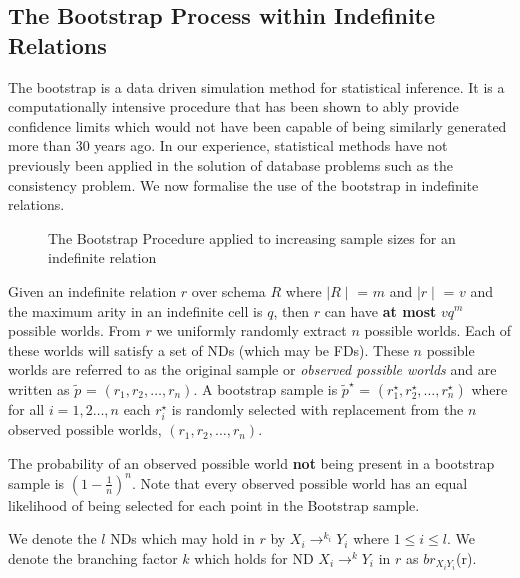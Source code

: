 \subsection{The Bootstrap Process within Indefinite Relations}


The bootstrap \cite{et93} is a data driven simulation method for
statistical inference. It is a computationally intensive procedure
that has been shown to ably provide confidence limits which would not have
been capable of being similarly generated more than 30 years ago.
In our experience, statistical methods have not previously been 
applied in the solution of database problems such as the consistency problem.
We now formalise the use of the bootstrap in indefinite relations.
\medskip

\begin{figure}[ht]
\centerline{}
\caption{\label{fig:inc_boot} The Bootstrap Procedure applied to
increasing sample sizes for an indefinite relation }
\end{figure}


\begin{definition}
\begin{rm}
Given an indefinite relation $r$ over schema $R$ where $\mid R \mid$ =
$m$ and $\mid r \mid$ = $v$ and the maximum arity in an
indefinite cell is $q$, then $r$ can have {\bf at most} $vq^{m}$ possible
worlds.  From $r$ we uniformly randomly extract $n$ possible worlds.
Each of these worlds will satisfy a set of NDs (which may be FDs). These $n$ possible
worlds are referred to as the original sample or {\em observed possible 
worlds }
and are written as {\bf $\tilde{p}$} = $(r_1, r_2, \ldots, r_n)$. A
bootstrap sample is {\bf $\tilde{p}^\star$} = $(r_1^\star, r_2^\star, \ldots, r_n^\star )$ where for all $i = 1,2 \ldots, n$ each $r_i^\star$ is randomly
selected with replacement from the $n$ observed possible worlds,
 $(r_1, r_2, \ldots, r_n)$.
\end{rm}
\end{definition}

The probability of an observed possible world {\bf not} being
present in a bootstrap sample is $(1 - \frac{1}{n})^n$.  Note that
every observed possible world has an equal likelihood of being 
selected for each point in the Bootstrap sample. 

\medskip

We denote the $l$ NDs which may hold in
$r$ by $X_i \to^{k_i} Y_i$ where $1 \le i \le l$.
We denote the branching factor $k$ which holds for ND $X_i \to^k Y_i$ in
$r$ as $br_{X_iY_i}$(r).  

